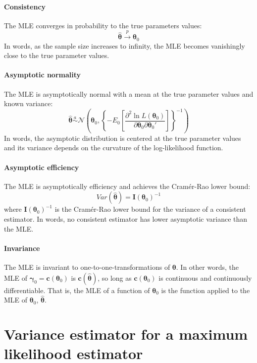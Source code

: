 \documentclass[11pt,letterpaper]{article}
\begin{document}
\paragraph{Consistency} The MLE converges in probability to the true parameters values:
$$\widehat{\bm{\theta}} \overset{p}{\rightarrow} \bm{\theta}_0$$
In words, as the sample size increases to infinity, the MLE becomes vanishingly close to the true parameter values.

\paragraph{Asymptotic normality} The MLE is asymptotically normal with a mean at the true parameter values and known variance:
$$\widehat{\bm{\theta}} \overset{a}{\sim} \mathcal{N} \left( \bm{\theta}_0, \left\{ -E_0 \left[ \frac{\partial^2 \ln L(\bm{\theta}_0)}{\partial \bm{\theta}_0 \partial \bm{\theta}_0'} \right] \right\}^{-1} \right)$$
In words, the asymptotic distribution is centered at the true parameter values and its variance depends on the curvature of the log-likelihood function.

\paragraph{Asymptotic efficiency} The MLE is asymptotically efficiency and achieves the Cram\'er-Rao lower bound:
$$Var(\widehat{\bm{\theta}}) = \bm{I}(\bm{\theta}_0)^{-1}$$
where $\bm{I}(\bm{\theta}_0)^{-1}$ is the Cram\'er-Rao lower bound for the variance of a consistent estimator. In words, no consistent estimator has lower asymptotic variance than the MLE.

\paragraph{Invariance} The MLE is invariant to one-to-one-transformations of $\bm{\theta}$. In other words, the MLE of $\bm{\gamma}_0 = \bm{c}(\bm{\theta}_0)$ is $\bm{c}(\widehat{\bm{\theta}})$, so long as $\bm{c}(\bm{\theta}_0)$ is continuous and continuously differentiable. That is, the MLE of a function of $\bm{\theta}_0$ is the function applied to the MLE of $\bm{\theta}_0$, $\widehat{\bm{\theta}}$.

\section{Variance estimator for a maximum likelihood estimator}
\end{document}
